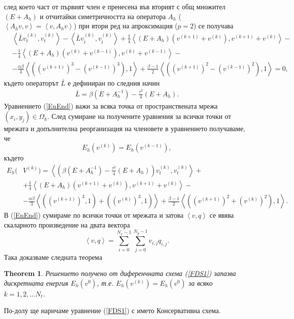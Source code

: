 \documentclass{article}
\newcommand{\be}{\begin{equation}}
\newcommand{\ee}{\end{equation}}
\newcommand{\rf}[1]{(\ref{#1})}
\newtheorem{thm}{Theorem}
\begin{document}
след което част от първият член е пренесена във вторият с общ множител $(E + A_h )$ и отчитайки симетричността на оператора $A_h$ ($\left< A_h v,v\right> = \left< v, A_h v\right>$) при втори ред на апроксимация ($p=2$) се получава
\begin{align}\label{EnEnd}
&\left< \bar L  v_{t}^{(k)}, v_{t}^{(k)} \right> - \left< \bar L v_{\bar t}^{(k)}, v_{\bar t}^{(k)} \right>  
 +\frac{1}{4} \left<  (E +A_h ) \left( v^{(k+1)} + v^{(k)} \right ) , v^{(k+1)} + v^{(k)} \right>  -\nonumber \\
&- \frac{1}{4} \left<  (E +A_h ) \left( v^{(k)} + v^{(k-1)} \right ) , v^{(k)} + v^{(k-1)} \right> - \nonumber \\
&- \frac{\alpha \beta}{3} \left< \left( (v^{(k+1)})^3-(v^{(k-1)})^3 \right), 1 \right> + \frac{\beta - 1}{2} \left< \left( (v^{(k+1)})^2-(v^{(k-1)})^2 \right), 1 \right> =0,
\end{align}
където операторът $\bar L$ е дефиниран по следния начин
\begin{align}
\bar L = \beta (E+A_h^{-1})- \frac{\tau^2}{4}( E+A_h ).
\end{align}
Уравнението \rf{EnEnd} важи за всяка точка от пространствената мрежа $(x_i,y_j) \in \Omega_h$. След сумиране на получените уравнения за всички точки от мрежата и допълнителна реорганизация на членовете в уравнението получаваме, че
\be \label{num_en}
E_h(v^{(k)}) =E_h(v^{(k-1)}),
\ee
където
\begin{align}\label{en_norm}
E_h(&V^{(k)})=\left< \left( \beta (E+A_h^{-1})- \frac{\tau^2}{4}( E+A_h ) \right)v_{t}^{(k)} ,v_{t}^{(k)} \right>+ \nonumber\\
&+\frac{1}{4}  \left<  ( E+A_h)(v^{(k+1)}+v^{(k)}), v^{(k+1)}+v^{(k)} \right> - \nonumber\\
&- \frac{\alpha \beta}{3} \left< ((v^{(k+1)})^3,1)+((v^{(k)})^3,1) \right> + \frac{\beta - 1}{2} \left< \left( (v^{(k+1)})^2+(v^{(k)})^2 \right), 1 \right>.
\end{align}
В \rf{EnEnd} сумираме по всички точки от мрежата и затова  $\left< v, q \right>$ се явява скаларното произведение на двата вектора 
\be\label{dotProd}
\left<v, q \right> = \sum_{i=0}^{N_x-1} \sum_{j=0}^{N_y-1} v_{i,j} q_{i,j}.
\ee
Така доказваме следната теорема
\begin{thm}
Решението получено от диференчната схема \rf{FDS1} запазва дискретната енергия $E_h(v^0)$, т.е.  $E_h(v^{(k)}) =E_h(v^{0})$ за всяко $k=1,2,...N_t$.
\end{thm}
По-долу ще наричаме уравнение \rf{FDS1} с името Консервативна схема.
\end{document}
